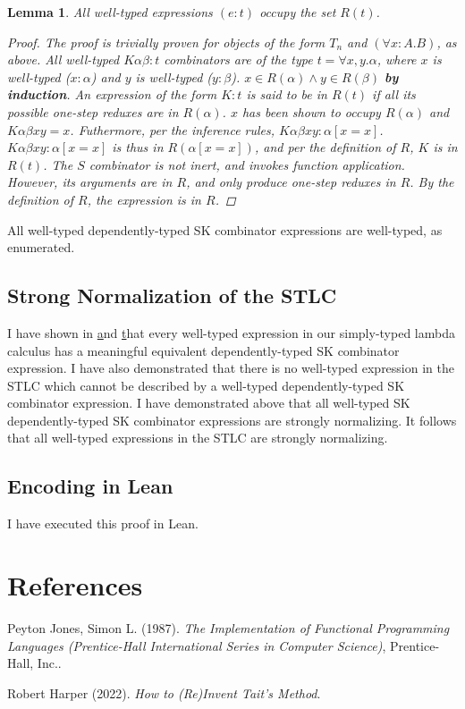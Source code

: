 \documentclass[11pt]{article}
\newtheorem{lemma}[theorem]{Lemma}
\begin{document}
\begin{enumerate}
\begin{lemma}
All well-typed expressions $(e : t)$ occupy the set $R(t)$.
\begin{proof}
The proof is trivially proven for objects of the form $T_{n}$ and $(\forall x:A.B)$, as above.
All well-typed $K \alpha \beta : t$ combinators are of the type $t = \forall x, y.\alpha$, where $x$ is well-typed ($x : \alpha$) and $y$ is well-typed ($y : \beta$).
$x \in R(\alpha) \land y \in R(\beta)$ \textbf{by induction}.
An expression of the form $K : t$ is said to be in $R(t)$ if all its possible one-step reduxes are in $R(\alpha)$.
$x$ has been shown to occupy $R(\alpha)$ and $K \alpha \beta x y = x$. Futhermore, per the inference rules, $K \alpha \beta x y : \alpha[x = x]$. $K \alpha \beta x y : \alpha[x = x]$ is thus in $R(\alpha[x = x])$,
and per the definition of $R$, $K$ is in $R(t)$. The $S$ combinator is not inert, and invokes function application. However, its arguments are in $R$, and only produce one-step reduxes in $R$. By the definition of $R$, the expression is in $R$.
\end{proof}
\end{lemma}

All well-typed dependently-typed SK combinator expressions are well-typed, as enumerated.
\end{enumerate}
\subsection{Strong Normalization of the STLC}
\label{sec:orga39c263}

I have shown in \href{decomplemma:1} and \href{maplemma:1} that every well-typed expression in our simply-typed lambda calculus has a meaningful equivalent dependently-typed SK combinator expression.
I have also demonstrated that there is no well-typed expression in the STLC which cannot be described by a well-typed dependently-typed SK combinator expression.
I have demonstrated above that all well-typed SK dependently-typed SK combinator expressions are strongly normalizing. It follows that all well-typed expressions in the STLC are strongly normalizing.
\subsection{Encoding in Lean}
\label{sec:org4ea4486}

I have executed this proof in Lean.
\section{References}
\label{sec:org12ecebf}

\noindent
Peyton Jones, Simon L. (1987). \emph{The Implementation of Functional Programming Languages (Prentice-Hall International Series in Computer Science)}, Prentice-Hall, Inc..

\noindent
Robert Harper (2022). \emph{How to (Re)Invent Tait’s Method}.
\end{document}
